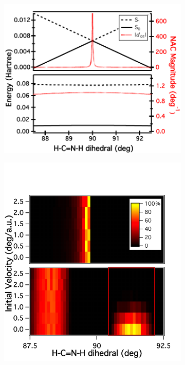 \begin{figure}[h!]
  \centering
  \vspace{-0.5cm}
  \begin{subfigure}[b]{0.40\textwidth}
  \includegraphics[width=\textwidth]{gs_es_dercp} 
  \caption{ }
  \label{fig:gs_es_dercp}
  \end{subfigure}
  \begin{subfigure}[b]{0.40\textwidth}
  \includegraphics[width=\textwidth]{stacked_hops} 

\end{subfigure}
\end{figure}

